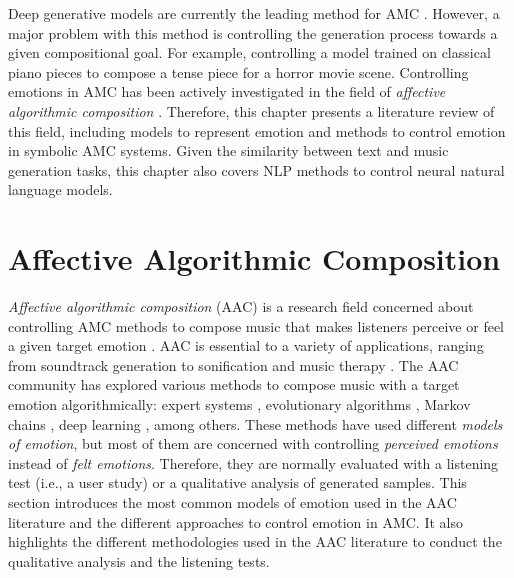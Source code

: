 Deep generative models are currently the leading method for AMC \cite{yang2019deep}. However, a major problem with this method is controlling the generation process towards a given compositional goal. For example, controlling a model trained on classical piano pieces to compose a tense piece for a horror movie scene. Controlling emotions in AMC has been actively investigated in the field of \textit{affective algorithmic composition} \cite{williams2015investigating}. Therefore, this chapter presents a literature review of this field, including models to represent emotion and methods to control emotion in symbolic AMC systems. Given the similarity between text and music generation tasks, this chapter also covers NLP methods to control neural natural language models.

\section{Affective Algorithmic Composition}

\textit{Affective algorithmic composition} (AAC) is a research field concerned about controlling AMC methods to compose music that makes listeners perceive or feel a given target emotion \cite{williams2015investigating}. AAC is essential to a variety of applications, ranging from soundtrack generation \cite{williams2015dynamic} to sonification \cite{Chen2015} and music therapy \cite{miranda2011brain}. The AAC community has explored various methods to compose music with a target emotion algorithmically: expert systems \cite{williams2015dynamic}, evolutionary algorithms \cite{kim2004composing}, Markov chains \cite{monteith2010automatic}, deep learning \cite{madhok2018sentimozart}, among others. These methods have used different \textit{models of emotion}, but most of them are concerned with controlling \textit{perceived emotions} instead of \textit{felt emotions}. Therefore, they are normally evaluated with a listening test (i.e., a user study) or a qualitative analysis of generated samples. This section introduces the most common models of emotion used in the AAC literature and the different approaches to control emotion in AMC. It also highlights the different methodologies used in the AAC literature to conduct the qualitative analysis and the listening tests.

